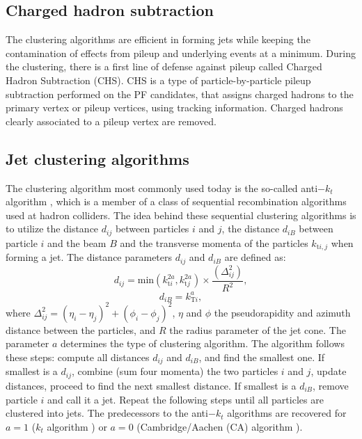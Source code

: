 \subsection*{Charged hadron subtraction}
\noindent\justify
The clustering algorithms are efficient in forming jets while keeping the contamination of effects from pileup and underlying events at a minimum.
During the clustering, there is a first line of defense against pileup called Charged Hadron Subtraction (CHS). 
CHS is a type of particle-by-particle pileup subtraction performed on the PF candidates, that assigns charged hadrons to the primary vertex or pileup vertices, using tracking information. 
Charged hadrons clearly associated to a pileup vertex are removed. 
\subsection*{Jet clustering algorithms}
\noindent\justify
The clustering algorithm most commonly used today is the so-called anti$-k_t$ algorithm \cite{Cacciari:2008gp}, which is a member of a class of sequential recombination algorithms used at hadron colliders. 
The idea behind these sequential clustering algorithms is to utilize the distance $d_{ij}$ between particles $i$ and $j$, the distance $d_{iB}$ between particle $i$ and the beam $B$ and the transverse momenta of the particles $k_{\mathrm{t}i,j}$ when forming a jet. 
The distance parameters $d_{ij}$ and $d_{iB}$ are defined as:
\begin{equation}
d_{ij}=\mathrm{min}(k_{\mathrm{t}i}^{2a}, k_{\mathrm{t}j}^{2a})\times\frac{(\Delta_{ij}^{2})}{R^{2}},
\end{equation}
\begin{equation}
d_{iB}=k_{\mathrm{T}i}^{a},
\end{equation}
where $\Delta_{ij}^{2}=(\eta_{i}-\eta_{j})^{2}+(\phi_{i}-\phi_{j})^{2}$, $\eta$ and $\phi$ the pseudorapidity and azimuth distance between the particles, and $R$ the radius parameter of the jet cone.
The parameter $a$ determines the type of clustering algorithm. 
The algorithm follows these steps: compute all distances $d_{ij}$ and $d_{iB}$, and find the smallest one. 
If smallest is a $d_{ij}$, combine (sum four momenta) the two particles $i$ and $j$, update distances, proceed to find the next smallest distance. 
If smallest is a $d_{iB}$, remove particle $i$ and call it a jet. Repeat the following steps until all particles are clustered into jets. 
The predecessors to the anti$-k_t$ algorithms are recovered for $a=1$ ($k_{t}$ algorithm \cite{Salam:2009jx}) or $a=0$ (Cambridge/Aachen (CA) algorithm \cite{Dokshitzer:1997in}).  
